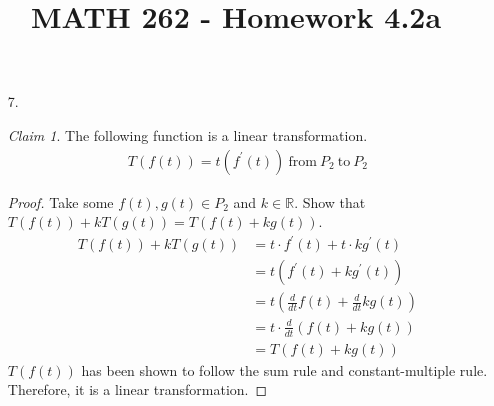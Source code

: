 \documentclass[letterpaper,12pt]{article}
\author{}
\title{MATH 262 - Homework 4.2a}
\date{} %
\theoremstyle{remark}
\newtheorem*{claim}{Claim}
\begin{document}
\maketitle

\begin{enumerate}
  \item[7.]
    \begin{claim}
      The following function is a linear transformation.
      \begin{align*}
        T(f(t)) = t(f^\prime(t)) \ \text{from} \ P_2 \ \text{to} \ P_2
      \end{align*}
    \end{claim}
    \begin{proof}
      Take some $f(t),g(t) \in P_2$ and $k \in \mathbb{R}$. Show that $T(f(t)) + kT(g(t)) = T(f(t) + kg(t))$.
      \begin{align*}
        T(f(t)) + kT(g(t)) &= t \cdot f^\prime(t) + t \cdot kg^\prime(t) \\
        &= t(f^\prime(t) + kg^\prime(t)) \\
        &= t(\frac{d}{dt}f(t) + \frac{d}{dt}kg(t)) \\
        &= t \cdot \frac{d}{dt}(f(t) + kg(t)) \\
        &= T(f(t) + kg(t))
      \end{align*}
      $T(f(t))$ has been shown to follow the sum rule and constant-multiple rule. Therefore, it is a linear transformation.
    \end{proof}
\end{enumerate}
\end{document}
